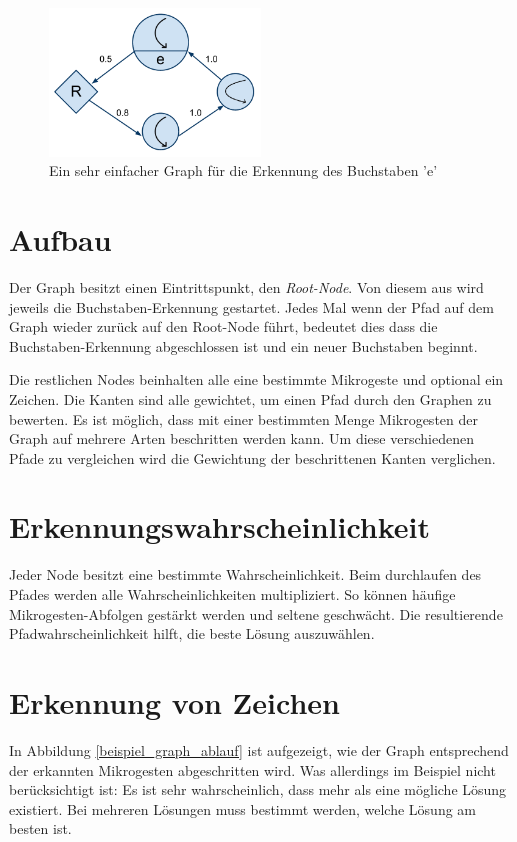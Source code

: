 \begin{figure}[h!]
  \centering
    \includegraphics[width=0.5\textwidth]{./img/BeispielGraph.pdf}
  \caption{Ein sehr einfacher Graph für die Erkennung des Buchstaben 'e'}
  \label{beispiel_graph}
\end{figure}

\section{Aufbau}
Der Graph besitzt einen Eintrittspunkt, den \emph{Root-Node}. Von diesem aus wird jeweils die Buchstaben-Erkennung gestartet. Jedes Mal wenn der Pfad auf dem Graph wieder zurück auf den Root-Node führt, bedeutet dies dass die Buchstaben-Erkennung abgeschlossen ist und ein neuer Buchstaben beginnt. 

Die restlichen Nodes beinhalten alle eine bestimmte Mikrogeste und optional ein Zeichen. Die Kanten sind alle gewichtet, um einen Pfad durch den Graphen zu bewerten. Es ist möglich, dass mit einer bestimmten Menge Mikrogesten der Graph auf mehrere Arten beschritten werden kann. Um diese verschiedenen Pfade zu vergleichen wird die Gewichtung der beschrittenen Kanten verglichen.

\section{Erkennungswahrscheinlichkeit}
Jeder Node besitzt eine bestimmte Wahrscheinlichkeit. Beim durchlaufen des Pfades werden alle Wahrscheinlichkeiten multipliziert. So können häufige Mikrogesten-Abfolgen gestärkt werden und seltene geschwächt. Die resultierende Pfadwahrscheinlichkeit hilft, die beste Lösung auszuwählen.

\section{Erkennung von Zeichen}

In Abbildung \ref{beispiel_graph_ablauf} ist aufgezeigt, wie der Graph entsprechend der erkannten Mikrogesten abgeschritten wird. Was allerdings im Beispiel nicht berücksichtigt ist: Es ist sehr wahrscheinlich, dass mehr als eine mögliche Lösung existiert. Bei mehreren Lösungen muss bestimmt werden, welche Lösung am besten ist. 

